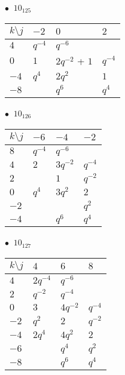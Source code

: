 %
\begin{minipage}{\linewidth}
$\bullet\ $ $10_{125}$ \vspace{0.5em} \\
\begin{tabular}{l|lll}
$k \setminus j$ & $-2$ & $0$ & $2$ \\
\hline
$4$ & $q^{-4}$ & $q^{-6}$ &  \\
$0$ & $1$ & $2q^{-2}$ + $1$ & $q^{-4}$ \\
$-4$ & $q^{4}$ & $2q^{2}$ & $1$ \\
$-8$ &  & $q^{6}$ & $q^{4}$ \\
\end{tabular}
\vspace{2em}
\end{minipage}
%
\begin{minipage}{\linewidth}
$\bullet\ $ $10_{126}$ \vspace{0.5em} \\
\begin{tabular}{l|lll}
$k \setminus j$ & $-6$ & $-4$ & $-2$ \\
\hline
$8$ & $q^{-4}$ & $q^{-6}$ &  \\
$4$ & $2$ & $3q^{-2}$ & $q^{-4}$ \\
$2$ &  & $1$ & $q^{-2}$ \\
$0$ & $q^{4}$ & $3q^{2}$ & $2$ \\
$-2$ &  &  & $q^{2}$ \\
$-4$ &  & $q^{6}$ & $q^{4}$ \\
\end{tabular}
\vspace{2em}
\end{minipage}
%
\begin{minipage}{\linewidth}
$\bullet\ $ $10_{127}$ \vspace{0.5em} \\
\begin{tabular}{l|lll}
$k \setminus j$ & $4$ & $6$ & $8$ \\
\hline
$4$ & $2q^{-4}$ & $q^{-6}$ &  \\
$2$ & $q^{-2}$ & $q^{-4}$ &  \\
$0$ & $3$ & $4q^{-2}$ & $q^{-4}$ \\
$-2$ & $q^{2}$ & $2$ & $q^{-2}$ \\
$-4$ & $2q^{4}$ & $4q^{2}$ & $2$ \\
$-6$ &  & $q^{4}$ & $q^{2}$ \\
$-8$ &  & $q^{6}$ & $q^{4}$ \\
\end{tabular}
\vspace{2em}
\end{minipage}
